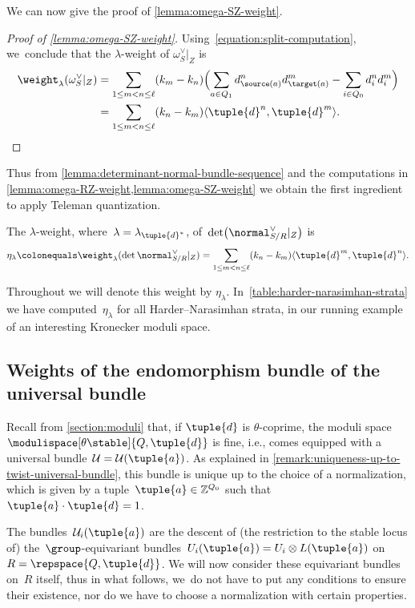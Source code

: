 We can now give the proof of \cref{lemma:omega-SZ-weight}.
\begin{proof}[Proof of \cref{lemma:omega-SZ-weight}]
Using~\eqref{equation:split-computation}, we~conclude that the $\lambda$-weight of $\omega_S^\vee|_Z$ is
\begin{align*}
\weight_{\lambda}(\omega_S^\vee|_Z)
&= \sum_{1 \leq m < n \leq \ell} (k_m - k_n) \Bigl(\sum_{a \in Q_1} d_{\source(a)}^n d_{\target(a)}^m - \sum_{i \in Q_0} d_i^n d_i^m\Bigr) \\
&= \sum_{1\leq m < n \leq \ell} (k_n - k_m) \langle \tuple{d}^n,\tuple{d}^m \rangle.\qedhere
\end{align*}
\end{proof}
Thus from \cref{lemma:determinant-normal-bundle-sequence}
and the computations in \cref{lemma:omega-RZ-weight,lemma:omega-SZ-weight}
we obtain the first ingredient to apply Teleman quantization.
\begin{corollary}
\label{corollary:determinant-weight}
The $\lambda$-weight,
where~$\lambda=\lambda_{\tuple{d}^*}$,
of~$\det\bigl(\normal_{S/R}^\vee|_Z\bigr)$ is
\begin{equation}
\eta_\lambda\colonequals\weight_{\lambda}(\det\normal_{S/R}^\vee|_Z) = \sum_{1 \leq m < n \leq \ell}(k_n - k_m)\langle \tuple{d}^m,\tuple{d}^n \rangle.
\end{equation}
\end{corollary}
Throughout we will denote this weight by $\eta_\lambda$. In~\cref{table:harder-narasimhan-strata} we have computed~$\eta_\lambda$
for all Harder--Narasimhan strata,
in our running example of an interesting Kronecker moduli space.

\subsection{Weights of the endomorphism bundle of the universal bundle}
\label{subsection:weights-endomorphism-bundle}
Recall from \cref{section:moduli} that,
if $\tuple{d}$ is $\theta$-coprime,
the moduli space~$\modulispace[\theta\stable]{Q,\tuple{d}}$
is fine, i.e.,
comes equipped with a universal bundle~$\mathcal{U}=\mathcal{U}(\tuple{a})$.
As explained in \cref{remark:uniqueness-up-to-twist-universal-bundle},
this bundle is unique up to the choice of a normalization,
which is given by a tuple~$\tuple{a}\in\mathbb{Z}^{Q_0}$ such that~$\tuple{a}\cdot\tuple{d}=1$.

The bundles~$\mathcal{U}_i(\tuple{a})$ are the descent of
(the restriction to the stable locus of)
the~$\group$\nobreakdash-equivariant bundles~$U_i(\tuple{a})=U_i\otimes L(\tuple{a})$
on~$R=\repspace{Q,\tuple{d}}$.
We will now consider these equivariant bundles on~$R$ itself,
thus in what follows, we~do not have to put any conditions to ensure their existence,
nor do we have to choose a normalization with certain properties.

